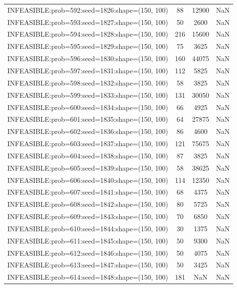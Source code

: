 \begin{longtable}{lccc}
INFEASIBLE:prob=592:seed=1826:shape=(150, 100) &    88 & 12900 &    NaN \\
INFEASIBLE:prob=593:seed=1827:shape=(150, 100) &    50 &  2600 &    NaN \\
INFEASIBLE:prob=594:seed=1828:shape=(150, 100) &   216 & 15600 &    NaN \\
INFEASIBLE:prob=595:seed=1829:shape=(150, 100) &    75 &  3625 &    NaN \\
INFEASIBLE:prob=596:seed=1830:shape=(150, 100) &   160 & 44075 &    NaN \\
INFEASIBLE:prob=597:seed=1831:shape=(150, 100) &   112 &  5825 &    NaN \\
INFEASIBLE:prob=598:seed=1832:shape=(150, 100) &    58 &  3825 &    NaN \\
INFEASIBLE:prob=599:seed=1833:shape=(150, 100) &   131 & 30050 &    NaN \\
INFEASIBLE:prob=600:seed=1834:shape=(150, 100) &    66 &  4925 &    NaN \\
INFEASIBLE:prob=601:seed=1835:shape=(150, 100) &    64 & 27875 &    NaN \\
INFEASIBLE:prob=602:seed=1836:shape=(150, 100) &    86 &  4600 &    NaN \\
INFEASIBLE:prob=603:seed=1837:shape=(150, 100) &   121 & 75675 &    NaN \\
INFEASIBLE:prob=604:seed=1838:shape=(150, 100) &    87 &  3825 &    NaN \\
INFEASIBLE:prob=605:seed=1839:shape=(150, 100) &    58 & 38625 &    NaN \\
INFEASIBLE:prob=606:seed=1840:shape=(150, 100) &   114 & 12350 &    NaN \\
INFEASIBLE:prob=607:seed=1841:shape=(150, 100) &    68 &  4375 &    NaN \\
INFEASIBLE:prob=608:seed=1842:shape=(150, 100) &    80 &  5725 &    NaN \\
INFEASIBLE:prob=609:seed=1843:shape=(150, 100) &    70 &  6850 &    NaN \\
INFEASIBLE:prob=610:seed=1844:shape=(150, 100) &    30 &  1375 &    NaN \\
INFEASIBLE:prob=611:seed=1845:shape=(150, 100) &    50 &  9300 &    NaN \\
INFEASIBLE:prob=612:seed=1846:shape=(150, 100) &    50 &  4075 &    NaN \\
INFEASIBLE:prob=613:seed=1847:shape=(150, 100) &    50 &  3425 &    NaN \\
INFEASIBLE:prob=614:seed=1848:shape=(150, 100) &   181 &   NaN &    NaN \\

\end{longtable}
